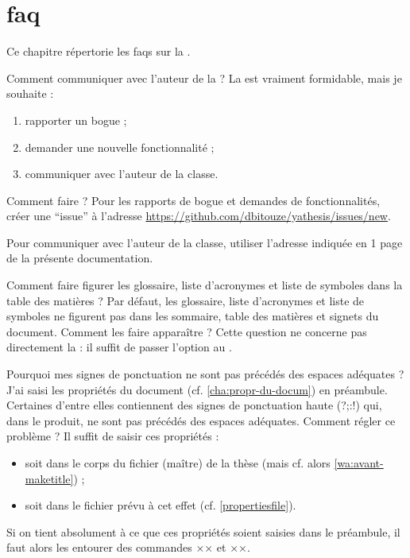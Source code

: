\chapter{\texorpdfstring{\acrshort{faq}}{FAQ}}\label{cha:faq}

Ce chapitre répertorie les \glspl{faq} sur la \yatcl{}.

\begin{dbfaq}{Comment communiquer avec l'auteur de la \yatcl{} ?}{}
  La \yatcl{} est vraiment formidable, mais je souhaite :
  \begin{enumerate}
  \item rapporter un bogue ;
  \item demander une nouvelle fonctionnalité ;
  \item communiquer avec l'auteur de la classe.
  \end{enumerate}
  Comment faire ?
  \tcblower
  Pour les rapports de bogue et demandes de fonctionnalités, créer une
  \enquote{issue} à l'adresse
  \url{https://github.com/dbitouze/yathesis/issues/new}.

  Pour communiquer avec l'auteur de la classe, utiliser l'adresse indiquée en
  1\iere{} page de la présente documentation.
\end{dbfaq}

\begin{dbfaq}{Comment faire figurer les glossaire, liste d'acronymes et liste
    de symboles dans la table des matières ?}{}
  Par défaut, les glossaire, liste d'acronymes et liste de symboles ne figurent
  pas dans les sommaire, table des matières et signets du document. Comment les
  faire apparaître ?
  \tcblower
  Cette question ne concerne pas directement la \yatcl{} : il suffit de passer
  l'option  au .
\end{dbfaq}

\begin{dbfaq}{Pourquoi mes signes de ponctuation ne sont pas précédés
    des espaces adéquates ?}{}
  J'ai saisi les propriétés du document (cf. \vref{cha:propr-du-docum}) en
  préambule. Certaines d'entre elles contiennent des signes de ponctuation
  haute ({\NoAutoSpacing?;:!}) qui, dans le \pdf produit, ne sont pas précédés
  des espaces adéquates. Comment régler ce problème ?
  \tcblower
  Il suffit de saisir ces propriétés :
  \begin{itemize}
  \item soit dans le corps du fichier (maître) de la thèse (mais cf. alors
    \vref{wa:avant-maketitle}) ;
  \item soit dans le fichier \file{\propertiesfile} prévu à cet effet
    (cf. \vref{propertiesfile}).
  \end{itemize}
  Si on tient absolument à ce que ces propriétés soient saisies dans le
  préambule, il faut alors les entourer des commandes ×× et
  ××.
\end{dbfaq}

